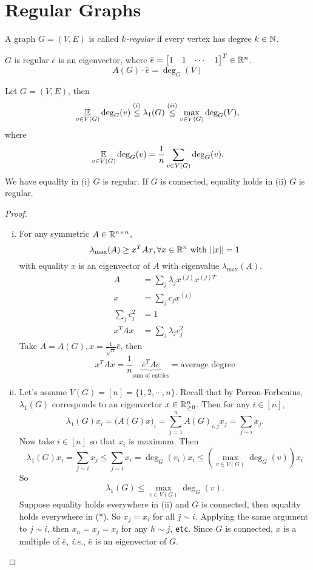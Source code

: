 \section{Regular Graphs}
\begin{definition}
A graph \(G=(V,E)\) is called \emph{\(k\)-regular} if every vertex has degree \(k\in\mathbb{N}\).
\end{definition}
\begin{remark}
\(G\) is regular \iff \(\bar e\) is an eigenvector, where \(\bar e=\begin{bmatrix} 1 & 1 & \cdots & 1 \end{bmatrix}^T\in\mathbb{R}^n \).
\[ A(G)\cdot\bar e=\deg_G(V) \]
\end{remark}

\begin{proposition}
Let \(G=(V,E)\), then
\[ \operatorname*{\mathbb{E}}_{v\in V(G)} \deg_G(v) \stackrel{(i)}{\leq} \lambda_1(G) \stackrel{(ii)}{\leq} \max_{v\in V(G)}\deg_G(V), \]
where
\[ \operatorname*{\mathbb{E}}_{v\in V(G)} \deg_G(v)=\frac{1}{n}\sum_{v\in V(G)}\deg_G(v). \]
We have equality in (i) \iff \(G\) is regular.
If \(G\) is connected, equality holds in (ii) \iff \(G\) is regular.
\end{proposition}
\begin{proof}
\begin{enumerate}[(i)]
\item For any symmetric \(A\in\mathbb{R}^{n\times n}\),
\[ \lambda_{\max}(A)\geq x^T Ax, \forall x\in\mathbb{R}^n \text{ with } ||x||=1 \]
with equality \iff \(x\) is an eigenvector of \(A\) with eigenvalue \(\lambda_{\max}(A)\).
\begin{align*}
A&=\sum_j \lambda_j x^{(j)}x^{(j)T}\\
x&=\sum_j c_j x^{(j)}\\
\sum_j c_j^2&=1\\
x^T Ax&=\sum_j \lambda_j c_j^2
\end{align*}
Take \(A=A(G), x=\frac{1}{\sqrt{n}}\bar e\), then
\[ x^T Ax=\frac{1}{n} \underbrace{\bar e^T A\bar e}_{\text{sum of entries}}=\text{average degree} \]
\item Let's assume \(V(G)=[n]=\{1,2,\cdots,n\}\).
Recall that by Perron-Forbenius, \(\lambda_1(G)\) corresponds to an eigenvector \(x\in\mathbb{R}_{\ge0}^n\).
Then for any \(i\in[n]\),
\[ \lambda_1(G) x_i=\Big(A(G)x\Big)_i=\sum_{j=1}^{n} A(G)_{i,j}x_j=\sum_{j\sim i}x_j. \]
Now take \(i\in[n]\) so that \(x_i\) is maximum.
Then
\[ \lambda_1(G)x_i=\sum_{j\sim i}x_j\leq \sum_{j\sim i}x_i=\deg_G(v_i) x_i\leq \left( \max_{v\in V(G)}\deg_G(v) \right) x_i \tag{*} \]
So
\[ \lambda_1(G)\leq\max_{v\in V(G)}\deg_G(v). \]
Suppose equality holds everywhere in (ii) and \(G\) is connected, then equality holds everywhere in (*).
So \(x_j=x_i\) for all \(j\sim i\).
Applying the same argument to \(j\sim i\), then \(x_h=x_j=x_i\) for any \(h\sim j\), \texttt{etc}.
Since \(G\) is connected, \(x\) is a multiple of \(\bar e\), \textit{i.e.}, \(\bar e\) is an eigenvector of \(G\).
\end{enumerate}
\end{proof}
